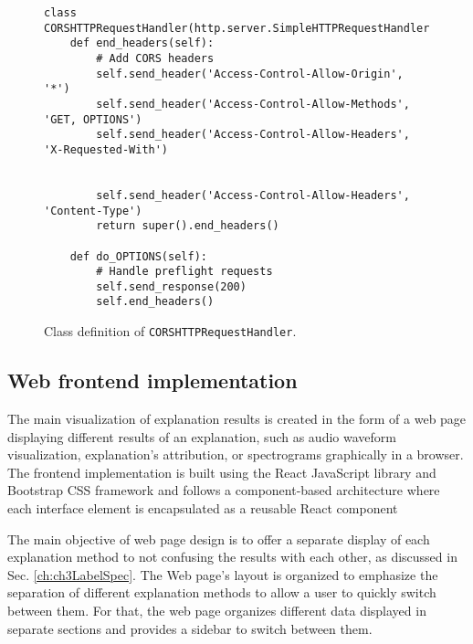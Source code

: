 \documentclass[
    bindingoffset=5mm,  %
    footnoteindent=3mm, %
    hyphenation=true    %
]{src/wut-thesis}
\begin{document}
\begin{figure}%
\begin{verbatim}
class CORSHTTPRequestHandler(http.server.SimpleHTTPRequestHandler):
    def end_headers(self):
        # Add CORS headers
        self.send_header('Access-Control-Allow-Origin', '*')
        self.send_header('Access-Control-Allow-Methods', 'GET, OPTIONS')
        self.send_header('Access-Control-Allow-Headers', 'X-Requested-With')

        
        self.send_header('Access-Control-Allow-Headers', 'Content-Type')
        return super().end_headers()

    def do_OPTIONS(self):
        # Handle preflight requests
        self.send_response(200)
        self.end_headers()
\end{verbatim}
\caption{Class definition of \texttt{CORSHTTPRequestHandler}.}
\label{fig:CORSHTTPRequestHandler}
\end{figure}

\subsection{Web frontend implementation} \label{ch:ch5WebFrontend}

The main visualization of explanation results is created in the form of a web page displaying different results of
an explanation, such as audio waveform visualization, explanation’s attribution, or spectrograms graphically in a
browser. The frontend implementation is built using the React JavaScript library \cite{ReactDOC}
and Bootstrap CSS framework \cite{BootstrapDOC} and follows a component-based architecture where each interface
element is encapsulated as a reusable React component


The main objective of web page design is to offer a separate display of each explanation method to not
confusing the results with each other, as discussed in Sec. \ref{ch:ch3LabelSpec}.
The Web page’s layout is organized to emphasize the separation of different explanation methods to allow
a user to quickly switch between them. For that, the web page organizes different data displayed in
separate sections and provides a sidebar to switch between them.
\end{document}
